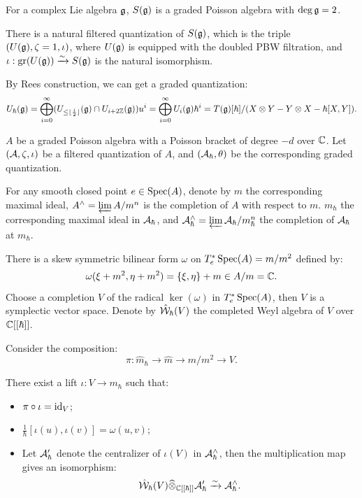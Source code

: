\begin{examp}
  For a complex Lie algebra $\mathfrak{g}$, $S(\mathfrak{g})$ is a graded Poisson algebra with $\deg \mathfrak{g} = 2$. 
  
  There is a natural filtered quantization of $S(\mathfrak{g})$, which is the triple $(U(\mathfrak{g}),\zeta = 1, \iota)$, where $U(\mathfrak{g})$ is equipped with the doubled PBW filtration, and $\iota: \operatorname{gr}(U(\mathfrak{g})) \xrightarrow{\sim} S(\mathfrak{g})$ is the natural isomorphism.

  By Rees construction, we can get a graded quantization:
  \[
    U_{\hbar}(\mathfrak{g}) = \bigoplus_{i=0}^{\infty} (U_{\leq \lfloor \frac{i}{2} \rfloor }(\mathfrak{g}) \cap U_{i+2\mathbb{Z}}(\mathfrak{g}) ) u^i = \bigoplus_{i=0}^{\infty} U_{i}(\mathfrak{g}) \hbar^i = T(\mathfrak{g})[\hbar]/(X \otimes Y - Y \otimes X - \hbar [X,Y]).
  \]
\end{examp}


$A$ be a graded Poisson algebra with a Poisson bracket of degree $-d$ over $\mathbb{C}$. Let $(\mathcal{A},\zeta,\iota)$ be a filtered quantization of $A$, and $(\mathcal{A}_{\hbar},\theta)$ be the corresponding graded quantization.

For any smooth closed point $e \in \operatorname{Spec}(A)$, denote by $m$ the corresponding maximal ideal, $A^{\wedge} = \varprojlim A/m^n$ is the completion of $A$ with respect to $m$. $m_{\hbar}$ the corresponding maximal ideal in $\mathcal{A}_{\hbar}$, and $\mathcal{A}_{\hbar}^{\wedge} = \varprojlim \mathcal{A}_{\hbar}/m_{\hbar}^n$ the completion of $\mathcal{A}_{\hbar}$ at $m_{\hbar}$.

There is a skew symmetric bilinear form $\omega$ on $T_e^* \operatorname{Spec}(A) = m/m^2$ defined by:
\[
  \omega(\xi + m^2,\eta + m^2) = \{\xi,\eta\} + m \in A/m = \mathbb{C}.
\]
Choose a completion $V$ of the radical $\ker(\omega)$ in $T_e^* \operatorname{Spec}(A)$, then $V$ is a symplectic vector space. Denote by $\hat{\mathcal{W}}_{\hbar}(V)$ the completed Weyl algebra of $V$ over $\mathbb{C}[[\hbar]]$. 

Consider the composition:
\[
  \pi: \hat{m}_{\hbar} \to \hat{m} \to m/m^2 \to V.
\]

\begin{thm}
  There exist a lift $\iota: V \to m_{\hbar}$ such that:
  \begin{itemize}
    \item $\pi \circ \iota = \operatorname{id}_V$;
    \item $\frac{1}{\hbar}[\iota(u),\iota(v)] = \omega(u,v)$;
    \item Let $\mathcal{A}_{\hbar}'$ denote the centralizer of $\iota(V)$ in $\mathcal{A}_{\hbar}^{\wedge}$, then the multiplication map gives an isomorphism:
    \[
      \hat{\mathcal{W}}_{\hbar}(V) \widehat{\otimes}_{{\mathbb{C}[[\hbar]]}} \mathcal{A}_{\hbar}' \xrightarrow{\sim} \mathcal{A}_{\hbar}^{\wedge}.
    \]
  \end{itemize}
\end{thm}

